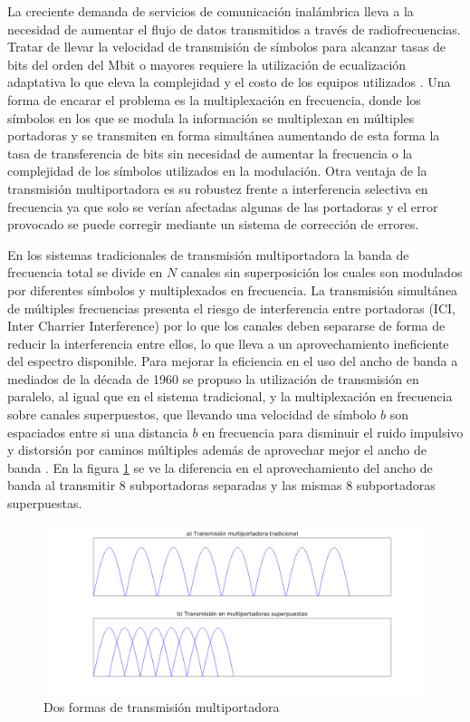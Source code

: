 La creciente demanda de servicios de comunicación inalámbrica lleva a la
necesidad de aumentar el flujo de datos transmitidos a través de
radiofrecuencias. Tratar de llevar la velocidad de transmisión de símbolos para
alcanzar tasas de bits del orden del Mbit o mayores requiere la utilización de
ecualización adaptativa lo que eleva la complejidad y el costo de los equipos
utilizados \cite{Prasad2_1}.
Una forma de encarar el problema es la multiplexación en frecuencia, donde los
símbolos en los que se modula la información se multiplexan en múltiples
portadoras y se transmiten en forma simultánea aumentando de esta forma la tasa de transferencia de
bits sin necesidad de aumentar la frecuencia o la complejidad de los símbolos utilizados en la
modulación. Otra ventaja de la transmisión multiportadora es su robustez frente a interferencia selectiva en frecuencia ya
que solo se verían afectadas algunas de las portadoras y el error provocado se
puede corregir mediante un sistema de corrección de errores. 

En los sistemas tradicionales de transmisión multiportadora la banda de
frecuencia total se divide en $N$ canales sin superposición los cuales son
modulados por diferentes símbolos y multiplexados en frecuencia. La transmisión simultánea de
múltiples frecuencias presenta el riesgo de interferencia entre portadoras (ICI, Inter Charrier
Interference) por lo que los canales deben separarse de forma de reducir la interferencia entre
ellos, lo que lleva a un aprovechamiento ineficiente del espectro disponible.
Para mejorar la eficiencia en el uso del ancho de banda a mediados de la
década de 1960 se propuso la utilización de transmisión en paralelo, al igual
que en el sistema tradicional, y la multiplexación en frecuencia sobre canales
superpuestos, que llevando una velocidad de símbolo $b$ son espaciados entre si una
distancia $b$ en frecuencia para disminuir el ruido impulsivo y distorsión por
caminos múltiples además de aprovechar mejor el ancho de banda \cite{Prasad2_1}.                  
En la figura \ref{fig:portadoras} se ve la diferencia en el aprovechamiento 
del ancho de banda al transmitir $8$ subportadoras separadas y las mismas $8$ 
subportadoras superpuestas.

\begin{figure}[htb!]
        \centering
        \includegraphics[width=17cm]{./figures/trad_mult.png}
        \caption{Dos formas de transmisión multiportadora}
        \label{fig:portadoras}
\end{figure}


